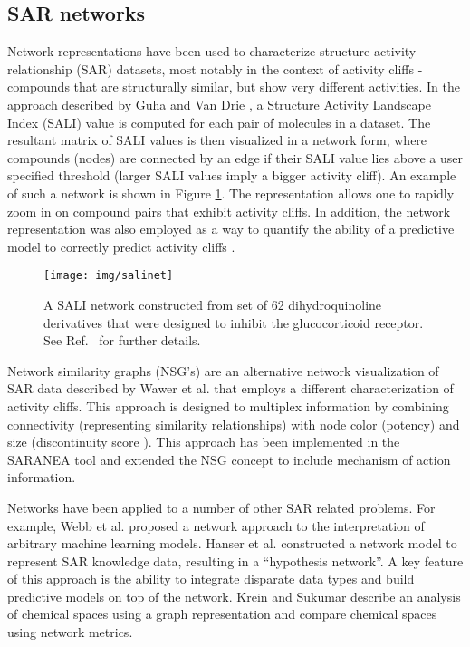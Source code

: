 \documentclass[]{book}
\begin{document}
\subsection{SAR networks}
\label{sec:sar-networks}

Network representations have been used to characterize
structure-activity relationship (SAR) datasets, most notably in the
context of activity cliffs \cite{Maggiora:2006aa} - compounds that are
structurally similar, but show very different activities. In the approach
described by Guha and Van Drie \cite{Guha:2008aa}, a Structure
Activity Landscape Index (SALI) value is computed for each pair of
molecules in a dataset. The resultant matrix of SALI values is then
visualized in a network form, where compounds (nodes) are connected by
an edge if their SALI value lies above a user specified threshold
(larger SALI values imply a bigger activity cliff). An example of such
a network is shown in Figure \ref{fig:salinet}. The representation
allows one to rapidly zoom in on compound pairs that exhibit activity
cliffs. In addition, the network representation was also employed as a
way to quantify the ability of a predictive model to correctly predict
activity cliffs \cite{Guha:2008ab}.

\begin{figure}[h]
  \centering
  \texttt{[image: img/salinet]} 
  \caption{A SALI network constructed from set of 62 dihydroquinoline
    derivatives that were designed to inhibit the glucocorticoid
    receptor. See Ref.~\cite{Guha:2008aa} for further details.}
  \label{fig:salinet}
\end{figure}

Network similarity graphs (NSG's) are an alternative network
visualization of SAR data described by Wawer et al. \cite{Wawer:2008aa}
that employs a different characterization of activity cliffs. This
approach is designed to multiplex information by combining
connectivity (representing similarity relationships) with node color
(potency) and size (discontinuity score \cite{Peltason:2007aa}). This
approach has been implemented in the SARANEA tool
\cite{Lounkine:2010fk} and extended \cite{Iyer:2011ij} the NSG concept
to include mechanism of action information.

Networks have been applied to a number of other SAR related
problems. For example, Webb et al. \cite{Webb:2014tp} proposed a
network approach to the interpretation of arbitrary machine learning
models. Hanser et al. \cite{Hanser:2014gl} constructed a network model
to represent SAR knowledge data, resulting in a ``hypothesis
network''. A key feature of this approach is the ability to integrate
disparate data types and build predictive models on top of the
network. Krein and Sukumar \cite{Krein:2011tt} describe an analysis of
chemical spaces using a graph representation and compare chemical
spaces using network metrics.
\end{document}
